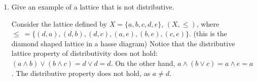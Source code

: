 \documentclass[12pt]{article}
\begin{document}
\begin{enumerate}
\begin{enumerate}
\begin{proof}
$(\subseteq)$. Let $i \in L_1$. Then $i \preceq x$ or $ i \preceq x \wedge y$. In both cases, it is true that $i \preceq x$, so $i \in L_2$.

$(\supseteq)$. Let $i \in L_2$. Then $i \preceq x$. There are two scenarios. Either $i \preceq y$ pr $i \npreceq y$. In the first case, $i \preceq x$ and $i \preceq y$. In the second case, $i \preceq x$ and $i \npreceq y$. So, $i \preceq x$ or $i\preceq x$ and $i \preceq y$. Thus, $i \preceq L_1$. 

Thus, we conclude $L_1 = L_2$, and $x\vee (x\wedge y)=x$. 
\end{proof}

\item $x\wedge(x\vee y)=x$

\begin{proof}
Let $L_1 = \{i \in X\ |\ i \preceq x$ and $ i \preceq x \vee y\}$ and $L_2 = \{i \in X\ |\ i \preceq x\}$. We will show that $L_1 = L_2$ by double containment. 

$(\subseteq)$. Let $i \in L_1$. Then $i \preceq x$ and $ i \preceq x \vee y$. In both cases, it is true that $i \preceq x$, so $i \in L_2$.

$(\supseteq)$. Let $i \in L_2$. Then $i \preceq x$. Then, $x \preceq x \vee y$ by definiton of a poset. So by transitivity, it follows that if $i \preceq x$ and $i \preceq x \vee y$,  then $i \preceq x \wedge (x \vee y)$, and $i \in L_1$. 

Thus, we conclude $L_1 = L_2$, and $x\wedge(x\vee y)=x$. 
\end{proof}
\end{enumerate}

\item Give an example of a lattice that is not distributive.

Consider the lattice defined by $X = \{a, b, c, d, e\}$, $(X, \leq)$, where $\leq\ = \{(d,a),(d, b), (d, c), (a, e), (b, e), (c, e)\}$. (this is the diamond shaped lattice in a hasse diagram) Notice that the distributive lattice property of distributivity does not hold: $(a \wedge b) \vee (b \wedge c) = d \vee d = d$. On the other hand, $a \wedge (b \vee c) = a \wedge e = a$. The distributive property does not hold, as $a \neq d$. 


\end{enumerate}
\end{document}

